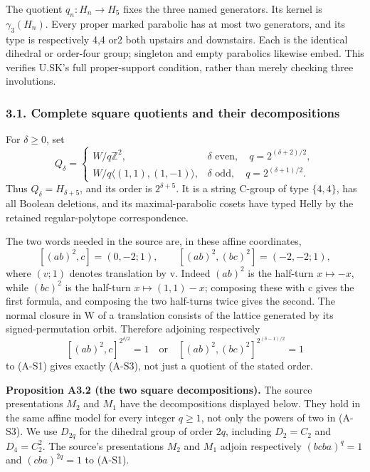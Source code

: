 \documentclass[
  11pt,
  a4paper,
]{article}
\begin{document}
The quotient \(q_n:H_n\to H_5\) fixes the three named generators. Its
kernel is \(\gamma_3(H_n)\). Every proper marked parabolic has at most
two generators, and its type is respectively 4,4 or2 both upstairs and
downstairs. Each is the identical dihedral or order-four group;
singleton and empty parabolics likewise embed. This verifies U.SK's full
proper-support condition, rather than merely checking three involutions.

\subsubsection{3.1. Complete square quotients and their
decompositions}\label{complete-square-quotients-and-their-decompositions}

For \(\delta\ge0\), set \[
 Q_\delta=
 \begin{cases}
 W/q\mathbb Z^2,&\delta\text{ even},\quad q=2^{(\delta+2)/2},\\
 W/q\langle(1,1),(1,-1)\rangle,&\delta\text{ odd},\quad q=2^{(\delta+1)/2}.
 \end{cases}
 \tag{A-S3}
\] Thus \(Q_\delta=H_{\delta+5}\), and its order is \(2^{\delta+5}\). It
is a string C-group of type \(\{4,4\}\), has all Boolean deletions, and
its maximal-parabolic cosets have typed Helly by the retained
regular-polytope correspondence.

The two words needed in the source are, in these affine coordinates, \[
 [(ab)^2,c]=(0,-2;1),\qquad
 [(ab)^2,(bc)^2]=(-2,-2;1),
 \tag{A-S4}
\] where \((v;1)\) denotes translation by v. Indeed \((ab)^2\) is the
half-turn \(x\mapsto-x\), while \((bc)^2\) is the half-turn
\(x\mapsto(1,1)-x\); composing these with c gives the first formula, and
composing the two half-turns twice gives the second. The normal closure
in W of a translation consists of the lattice generated by its
signed-permutation orbit. Therefore adjoining respectively \[
 [(ab)^2,c]^{2^{\delta/2}}=1
 \quad\text{or}\quad
 [(ab)^2,(bc)^2]^{2^{(\delta-1)/2}}=1
 \tag{A-S5}
\] to (A-S1) gives exactly (A-S3), not just a quotient of the stated
order.

\textbf{Proposition A3.2 (the two square decompositions).} The source
presentations \(M_2\) and \(M_1\) have the decompositions displayed
below. They hold in the same affine model for every integer \(q\ge1\),
not only the powers of two in (A-S3). We use \(D_{2q}\) for the dihedral
group of order \(2q\), including \(D_2=C_2\) and \(D_4=C_2^2\). The
source's presentations \(M_2\) and \(M_1\) adjoin respectively
\((bcba)^q=1\) and \((cba)^{2q}=1\) to (A-S1).
\end{document}
